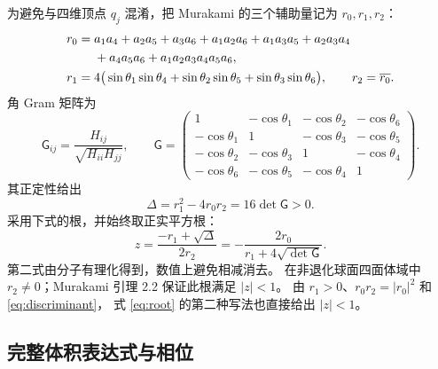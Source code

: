 \documentclass[UTF8,11pt,fontset=none]{ctexart}
\numberwithin{equation}{section}
\theoremstyle{definition}
\begin{document}
为避免与四维顶点 $q_j$ 混淆，把 Murakami 的三个辅助量记为 $r_0,r_1,r_2$：
\begin{align}
 r_0={}&a_1a_4+a_2a_5+a_3a_6
       +a_1a_2a_6+a_1a_3a_5+a_2a_3a_4\notag\\
     &+a_4a_5a_6+a_1a_2a_3a_4a_5a_6,\label{eq:r0}\\
 r_1={}&4\big(\sin\theta_1\sin\theta_4+
             \sin\theta_2\sin\theta_5+
             \sin\theta_3\sin\theta_6\big),\qquad
 r_2=\overline{r_0}.
 \label{eq:r1r2}
\end{align}
角 Gram 矩阵为
\begin{equation}
 \mathsf G_{ij}=\frac{H_{ij}}{\sqrt{H_{ii}H_{jj}}},\qquad
 \mathsf G=
 \begin{pmatrix}
 1&-\cos\theta_1&-\cos\theta_2&-\cos\theta_6\\
 -\cos\theta_1&1&-\cos\theta_3&-\cos\theta_5\\
 -\cos\theta_2&-\cos\theta_3&1&-\cos\theta_4\\
 -\cos\theta_6&-\cos\theta_5&-\cos\theta_4&1
 \end{pmatrix}.
 \label{eq:angle-gram}
\end{equation}
其正定性给出
\begin{equation}
 \Delta=r_1^2-4r_0r_2=16\det\mathsf G>0.
 \label{eq:discriminant}
\end{equation}
采用下式的根，并始终取正实平方根：
\begin{equation}
 \boxed{\quad
 z=\frac{-r_1+\sqrt\Delta}{2r_2}
   =-\frac{2r_0}{r_1+4\sqrt{\det\mathsf G}}.
 \quad}
 \label{eq:root}
\end{equation}
第二式由分子有理化得到，数值上避免相减消去。
在非退化球面四面体域中 $r_2\ne0$；Murakami 引理 2.2 保证此根满足 $|z|<1$。
由 $r_1>0$、$r_0r_2=|r_0|^2$ 和 \eqref{eq:discriminant}，
式 \eqref{eq:root} 的第二种写法也直接给出 $|z|<1$。

\subsection{完整体积表达式与相位}
\end{document}
